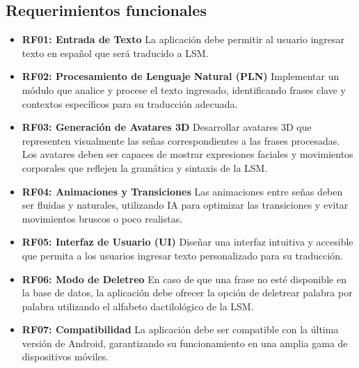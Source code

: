 \subsection{Requerimientos funcionales}
\begin{itemize}
    \item \textbf{RF01: Entrada de Texto}  
    La aplicación debe permitir al usuario ingresar texto en español que será traducido a LSM.
    
    \item \textbf{RF02: Procesamiento de Lenguaje Natural (PLN)}  
    Implementar un módulo que analice y procese el texto ingresado, identificando frases clave y contextos específicos para su traducción adecuada.
    
    \item \textbf{RF03: Generación de Avatares 3D}  
    Desarrollar avatares 3D que representen visualmente las señas correspondientes a las frases procesadas. Los avatares deben ser capaces de mostrar expresiones faciales y movimientos corporales que reflejen la gramática y sintaxis de la LSM.
    
    \item \textbf{RF04: Animaciones y Transiciones}  
    Las animaciones entre señas deben ser fluidas y naturales, utilizando IA para optimizar las transiciones y evitar movimientos bruscos o poco realistas.
    
    \item \textbf{RF05: Interfaz de Usuario (UI)}  
    Diseñar una interfaz intuitiva y accesible que permita a los usuarios ingresar texto personalizado para su traducción.
    
    \item \textbf{RF06: Modo de Deletreo}  
    En caso de que una frase no esté disponible en la base de datos, la aplicación debe ofrecer la opción de deletrear palabra por palabra utilizando el alfabeto dactilológico de la LSM.
    
    \item \textbf{RF07: Compatibilidad}  
    La aplicación debe ser compatible con la última versión de Android, garantizando su funcionamiento en una amplia gama de dispositivos móviles.
\end{itemize}



